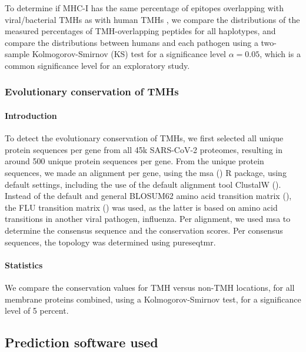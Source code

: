To determine if MHC-I has the same percentage of epitopes overlapping
with viral/bacterial TMHs as with human TMHs , 
we compare the distributions of the measured percentages 
of TMH-overlapping peptides for all haplotypes,
and compare the distributions between humans and each pathogen
using a two-sample Kolmogorov-Smirnov (KS) test
for a significance level $\alpha = 0.05$, 
which is a common significance level for an exploratory study.

\subsubsection{Evolutionary conservation of TMHs}

\paragraph{Introduction}

To detect the evolutionary conservation of TMHs,
we first selected all unique protein sequences per
gene from all 45k SARS-CoV-2 proteomes,
resulting in around 500 unique protein sequences per gene.
From the unique protein sequences, we made an alignment per gene,
using the msa (\cite{bodenhofer2015msa}) R package, 
using default settings, including the use of the default alignment tool
ClustalW (\cite{thompson1994clustal}).
Instead of the default and general BLOSUM62 amino acid transition matrix (\cite{henikoff1992amino}),
the FLU transition matrix (\cite{dang2010flu}) was used,
as the latter is based on amino acid transitions in another viral pathogen, influenza.
Per alignment, we used msa to determine the consensus sequence
and the conservation scores.
Per consensus sequences, the topology was determined using pureseqtmr.

\paragraph{Statistics}

We compare the conservation values for TMH versus non-TMH locations,
for all membrane proteins combined,
using a Kolmogorov-Smirnov test, for a significance level of 5 percent.

\subsection{Prediction software used}
\label{subsec:prediction_software_used}

